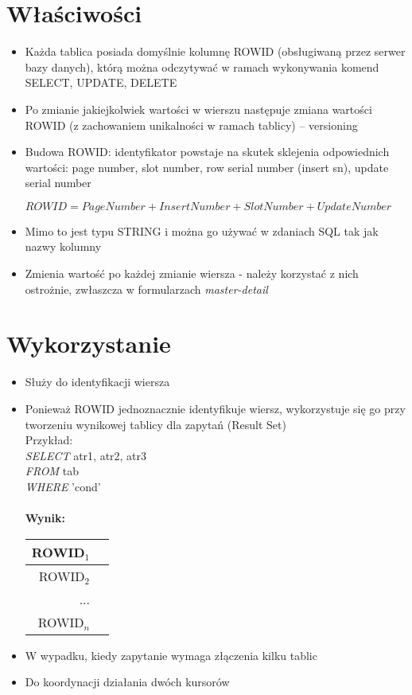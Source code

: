 \documentclass[a4paper,twoside]{article}
\begin{document}
  	\section*{Właściwości}
  	\begin{itemize}
  		\item Każda tablica posiada domyślnie kolumnę ROWID (obsługiwaną przez serwer bazy danych), którą można odczytywać w ramach wykonywania komend SELECT, UPDATE, DELETE
  		\item Po zmianie jakiejkolwiek wartości w wierszu następuje zmiana wartości ROWID (z zachowaniem unikalności w ramach tablicy) – versioning
  		\item Budowa ROWID: identyfikator powstaje na skutek sklejenia odpowiednich wartości: page number, slot number, row serial number (insert sn), update serial number
  		\begin{center}
  			\(ROWID = PageNumber  + InsertNumber + SlotNumber + UpdateNumber\)
  		\end{center}
  		\item Mimo to jest typu STRING i można go używać w zdaniach SQL tak jak nazwy kolumny
  		\item Zmienia wartość po każdej zmianie wiersza - należy korzystać z nich ostrożnie, zwłaszcza w formularzach \emph{master-detail}
  	\end{itemize}
  	\section*{Wykorzystanie}
  	\begin{itemize}
  		\item Służy do identyfikacji wiersza
  		\item Ponieważ ROWID jednoznacznie identyfikuje wiersz, wykorzystuje się go przy tworzeniu wynikowej tablicy dla zapytań (Result Set)\\
  		Przykład:\\
  		\emph{SELECT} atr1, atr2, atr3\\
  		\emph{FROM} tab\\
  		\emph{WHERE} 'cond'\\\\
  		\textbf{Wynik:}\\
  		\begin{tabular}{|r|l|}
  			\hline 
  			ROWID${_1}$\\
  			\hline
  			ROWID${_2}$ \\
  			\hline
  			...\\
  			\hline
  			ROWID${_n}$\\
  			\hline
  			
  		\end{tabular}
  		\item W wypadku, kiedy zapytanie wymaga złączenia kilku tablic
  		\item Do koordynacji działania dwóch kursorów
  	\end{itemize}
  	
\end{document}
